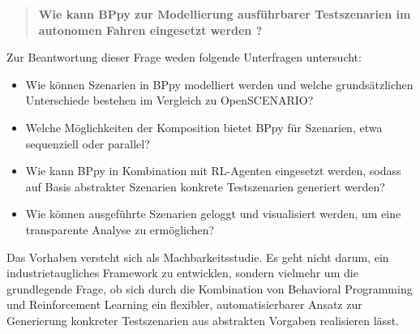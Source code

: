 \begin{quote}
\textbf{Wie kann BPpy zur Modellierung ausführbarer Testszenarien im autonomen Fahren eingesetzt werden ?}
\end{quote}

Zur Beantwortung dieser Frage weden folgende Unterfragen untersucht:
\begin{itemize}
    \item Wie können Szenarien in BPpy modelliert werden und welche grundsätzlichen Unterschiede bestehen im Vergleich zu OpenSCENARIO?
    \item Welche Möglichkeiten der Komposition bietet BPpy für Szenarien, etwa sequenziell oder parallel?
    \item Wie kann BPpy in Kombination mit RL-Agenten eingesetzt werden, sodass auf Basis abstrakter Szenarien konkrete Testszenarien generiert werden?
    \item Wie können ausgeführte Szenarien geloggt und visualisiert werden, um eine transparente Analyse zu ermöglichen?
\end{itemize}

Das Vorhaben versteht sich als Machbarkeitsstudie. Es geht nicht darum, ein industrietaugliches Framework zu entwicklen, sondern vielmehr um die grundlegende Frage, ob sich durch die Kombination von Behavioral Programming und Reinforcement Learning ein flexibler, automatisierbarer Ansatz zur Generierung konkreter Testszenarien aus abstrakten Vorgaben realisieren lässt.
